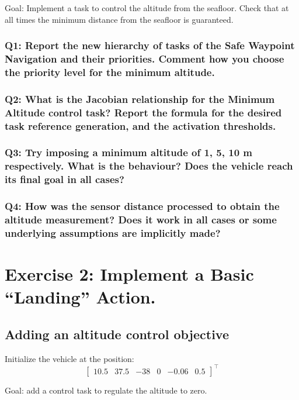 \documentclass{article}
\begin{document}
Goal: Implement a task to control the altitude from the seafloor. Check that at all times the minimum distance from the seafloor is guaranteed.


\subsubsection{Q1: Report the new hierarchy of tasks of the Safe Waypoint Navigation and their priorities. Comment how you choose the priority level for the minimum altitude.}

\subsubsection{Q2: What is the Jacobian relationship for the Minimum Altitude control task? Report the formula for the desired task reference generation, and the activation thresholds.}

\subsubsection{Q3: Try imposing a minimum altitude of 1, 5, 10 m respectively. What is the behaviour? Does the vehicle reach its final goal in all cases?}

\subsubsection{Q4: How was the sensor distance processed to obtain the altitude measurement? Does it work in all cases or some underlying assumptions are implicitly made?}

\clearpage

\section{Exercise 2: Implement a Basic “Landing” Action.}
\subsection{Adding an altitude control objective}
Initialize the vehicle at the position:
\begin{displaymath}
\begin{bmatrix} 10.5 & 37.5 & -38 & 0 & -0.06 & 0.5 \end{bmatrix}^\top
\end{displaymath} 

Goal: add a control task to regulate the altitude to zero.
\end{document}
